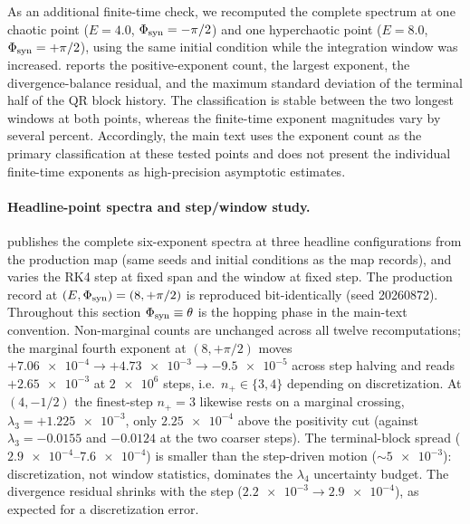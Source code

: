 \documentclass[preprint,numbers,a4paper]{elsarticle}
\begin{document}
As an additional finite-time check, we recomputed the complete spectrum at one chaotic point ($E=\num{4.0}$, $\Phi_{\rm syn}=-\pi/2$) and one hyperchaotic point ($E=\num{8.0}$, $\Phi_{\rm syn}=+\pi/2$), using the same initial condition while the integration window was increased.  reports the positive-exponent count, the largest exponent, the divergence-balance residual, and the maximum standard deviation of the terminal half of the QR block history. The classification is stable between the two longest windows at both points, whereas the finite-time exponent magnitudes vary by several percent. Accordingly, the main text uses the exponent count as the primary classification at these tested points and does not present the individual finite-time exponents as high-precision asymptotic estimates.

\paragraph{Headline-point spectra and step/window study.}
 publishes the complete six-exponent spectra at three headline configurations from the production map (same seeds and initial conditions as the map records), and  varies the RK4 step at fixed span and the window at fixed step. The production record at $(E,\Phi_{\rm syn})=(8,+\pi/2)$ is reproduced bit-identically (seed \num{20260872}). Throughout this section $\Phi_{\rm syn}\equiv\theta$ is the hopping phase in the main-text convention. Non-marginal counts are unchanged across all twelve recomputations; the marginal fourth exponent at $(8,+\pi/2)$ moves $+\num{7.06e-4}\to+\num{4.73e-3}\to\num{-9.5e-5}$ across step halving and reads $+\num{2.65e-3}$ at $\num{2e6}$ steps, i.e.\ $n_+\in\{3,4\}$ depending on discretization. At $(4,-1/2)$ the finest-step $n_+=3$ likewise rests on a marginal crossing, $\lambda_3=+\num{1.225e-3}$, only $\num{2.25e-4}$ above the positivity cut (against $\lambda_3=-\num{0.0155}$ and $-\num{0.0124}$ at the two coarser steps). The terminal-block spread ($\num{2.9e-4}$--$\num{7.6e-4}$) is smaller than the step-driven motion ($\sim\num{5e-3}$): discretization, not window statistics, dominates the $\lambda_4$ uncertainty budget. The divergence residual shrinks with the step ($\num{2.2e-3}\to\num{2.9e-4}$), as expected for a discretization error.
\end{document}
